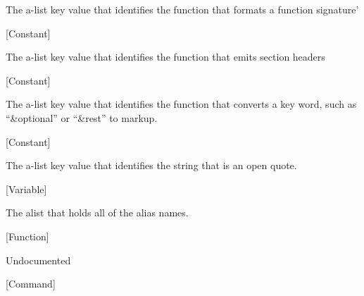 \begin{doc-string}
The a-list key value that identifies the function that formats a function signature'
\end{doc-string}

\vspace{1em}
\noindent
{}
\usebox{\funcname}
 \hfill [Constant]

\begin{doc-string}
The a-list key value that identifies the function that emits section headers
\end{doc-string}

\vspace{1em}
\noindent
{}
\usebox{\funcname}
 \hfill [Constant]

\begin{doc-string}
The a-list key value that identifies the function that converts a key word, such
as ``\&optional'' or ``\&rest'' to markup.
\end{doc-string}

\vspace{1em}
\noindent
{}
\usebox{\funcname}
 \hfill [Constant]

\begin{doc-string}
The a-list key value that identifies the string that is an open quote.
\end{doc-string}

\vspace{1em}
\noindent
{}
\usebox{\funcname}
 \hfill [Variable]

\begin{doc-string}
The alist that holds all of the alias names.
\end{doc-string}

\vspace{1em}
\noindent
{}
\usebox{\funcname}
 \hfill [Function]

\begin{doc-string}
Undocumented
\end{doc-string}

\vspace{1em}
\noindent
{}
\usebox{\funcname}
 \hfill [Command]

